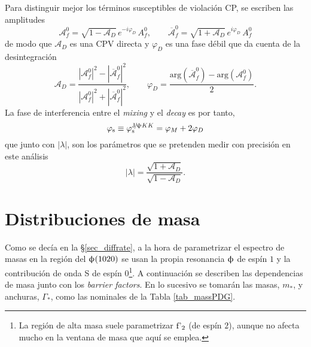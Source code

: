 Para distinguir mejor los términos susceptibles de violación CP, se escriben las amplitudes
\[\mathcal{A}_f^0 = \sqrt{1-\mathscr{A}_D} \, e^{-i \varphi_D} \, A_f^0, \qquad \overline{\mathcal{A}}_f^0 = \sqrt{1+\mathscr{A}_D} \, e^{i \varphi_D} \, A_f^0 \]
de modo que $\mathscr{A}_D $ es una CPV directa y $\varphi_D$ es una fase débil que da cuenta de la desintegración
\begin{equation}
	\mathscr{A}_D = \frac{|\mathcal{A}_f^0|^2-|\overline{\mathcal{A}}_f^0|^2}{|\mathcal{A}_f^0|^2+|\overline{\mathcal{A}}_f^0|^2}, \qquad \varphi_D = \frac{\text{arg}(\overline{\mathcal{A}}_f^0)-\text{arg}(\mathcal{A}_f^0)}{2}.
\end{equation}
%
La fase de interferencia entre el \textit{mixing} y el \emph{decay} es por tanto,
\begin{equation}
	\varphi_{\text{s}} \equiv \varphi_{\text{s}}^{\text{J}\!/\!\uppsi KK} = \varphi_{M} + 2 \varphi_{D} \label{eq_phismixdecay}
\end{equation}
que junto con $|\lambda|$, son los parámetros que se pretenden medir con precisión en este análisis
\begin{equation}
|\lambda| = \frac{\sqrt{1+\mathscr{A}_D}}{\sqrt{1-\mathscr{A}_D}}	.
\end{equation}





\section{Distribuciones de masa} %


Como se decía en la \S \ref{sec_diffrate}, a la hora de parametrizar el espectro de masas en la región del $\upphi(1020)$ se usan la propia resonancia $\upphi$ de espín $1$ y la contribución de onda S  de espín $0$\footnote{La región de alta masa suele parametrizar $\text{f'}_2$ (de espín $2$), aunque no afecta mucho en la ventana de masa que aquí se emplea.}. A continuación se describen las dependencias de masa junto con los \emph{barrier factors}. 
%
\color{dieg}
En lo sucesivo se tomarán las masas,  $m_{*}$, y anchuras, $\Gamma_{*
}$, como las nominales de la Tabla \ref{tab_massPDG}.


\color{dieg}


